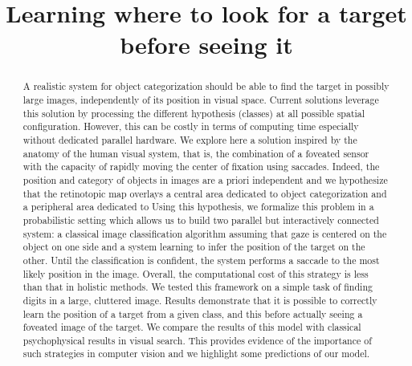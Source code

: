 \documentclass[a4]{article}
\title{
Learning where to look for a target before seeing it
}
\author{}
\begin{document}
\maketitle

\begin{abstract}
A realistic system for object categorization should be able to find the target in possibly large images, independently of its position in visual space. Current solutions leverage this solution by processing the different hypothesis (classes) at all possible spatial configuration. However, this can be costly in terms of computing time especially without dedicated parallel hardware. %
We explore here a solution inspired by the anatomy of the human visual system, that is, the combination of a foveated sensor with the capacity of rapidly moving the center of fixation using saccades. Indeed, the position and category of objects in images are a priori independent and we hypothesize that the retinotopic map overlays a central area dedicated to object categorization and a peripheral area dedicated to
Using this hypothesis, we formalize this problem in a probabilistic setting which allows us to build two parallel but interactively connected system: a classical image classification algorithm assuming that gaze is centered on the object on one side and a system learning to infer the position of the target on the other. Until the classification is confident, the system performs a saccade to the most likely position in the image. Overall, the computational cost of this strategy is less than that in holistic methods. %
We tested this framework on a simple task of finding digits in a large, cluttered image. Results demonstrate that it is possible to correctly learn the position of a target from a given class, and this before actually seeing a foveated image of the target. We compare the results of this model with classical psychophysical results in visual search. This provides evidence of the importance of such strategies in computer vision and we highlight some predictions of our model.
\end{abstract}

\newpage


\newpage



\newpage


\newpage

\end{document}
